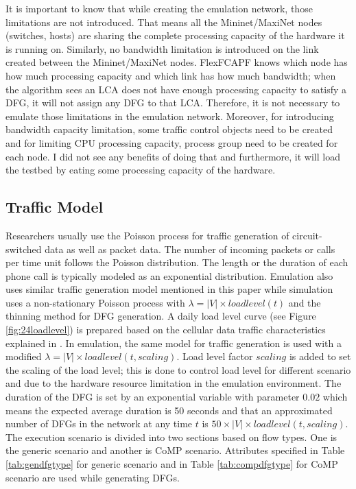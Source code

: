 It is important to know that while creating the emulation network, those limitations are not introduced. That means all the Mininet/MaxiNet nodes (switches, hosts) are sharing the complete processing capacity of the hardware it is running on. Similarly, no bandwidth limitation is introduced on the link created between the Mininet/MaxiNet nodes. FlexFCAPF knows which node has how much processing capacity and which link has how much bandwidth; when the algorithm sees an LCA does not have enough processing capacity to satisfy a DFG, it will not assign any DFG to that LCA. Therefore, it is not necessary to emulate those limitations in the emulation network. Moreover, for introducing bandwidth capacity limitation, some traffic control objects need to be created and for limiting CPU processing capacity, process group need to be created for each node. I did not see any benefits of doing that and furthermore, it will load the testbed by eating some processing capacity of the hardware.
 
\subsection{Traffic Model}
Researchers usually use the Poisson process for traffic generation of circuit-switched data as well as packet data. The number of incoming packets or calls per time unit follows the Poisson distribution. The length or the duration of each phone call is typically modeled as an exponential distribution. Emulation also uses similar traffic generation model mentioned in this paper \cite{7343600} while simulation uses a non-stationary Poisson process with $\lambda = |V| \times loadlevel(t)$ and the thinning method \cite{Law:1999:SMA:554952} for DFG generation. A daily load level curve (see Figure \ref{fig:24loadlevel}) is prepared based on the cellular data traffic characteristics explained in \cite{Zhang:2012:UCC:2342468.2342472}. In emulation, the same model for traffic generation is used with a modified $\lambda = |V| \times loadlevel(t, scaling)$. Load level factor $scaling$ is added to set the scaling of the load level; this is done to control load level for different scenario and due to the hardware resource limitation in the emulation environment. The duration of the DFG is set by an exponential variable with parameter $0.02$ which means the expected average duration is 50 seconds and that an approximated number of DFGs in the network at any time $t$ is $50 \times |V| \times loadlevel(t, scaling)$. The execution scenario is divided into two sections based on flow types. One is the generic \cite{7343600} scenario and another is CoMP \cite{MArasha} scenario. Attributes specified in Table \ref {tab:gendfgtype} for generic scenario and in Table \ref {tab:compdfgtype} for CoMP scenario are used while generating DFGs.

